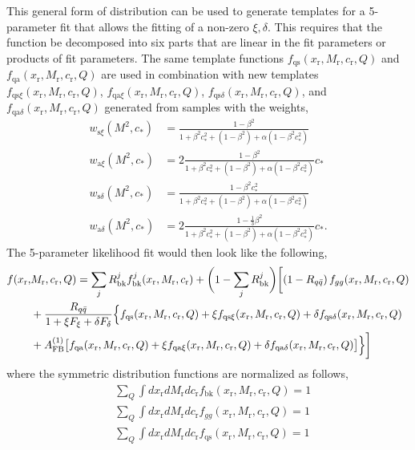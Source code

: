 This general form of distribution can be used to generate templates for a 5-parameter fit that allows the fitting of a non-zero $\xi,\delta$.  This requires that the function be decomposed into six parts that are linear in the fit parameters or products of fit parameters.  The same template functions $f_\mathrm{qs}(x_\mathrm{r}, M_\mathrm{r}, c_\mathrm{r},Q)$ and $f_\mathrm{qa}(x_\mathrm{r}, M_\mathrm{r}, c_\mathrm{r},Q)$ are used in combination with new templates $f_{\mathrm{qs}\xi}(x_\mathrm{r}, M_\mathrm{r}, c_\mathrm{r},Q)$, $f_{\mathrm{qa}\xi}(x_\mathrm{r}, M_\mathrm{r}, c_\mathrm{r},Q)$, $f_{\mathrm{qs}\delta}(x_\mathrm{r}, M_\mathrm{r}, c_\mathrm{r},Q)$, and $f_{\mathrm{qa}\delta}(x_\mathrm{r}, M_\mathrm{r}, c_\mathrm{r},Q)$ generated from samples with the weights,
\begin{align}
w_{\mathrm{s}\xi}(M^2, c_*) &= \frac{1-\beta^2}{1+\beta^2c_*^2+\left(1-\beta^2\right)+\alpha\left(1-\beta^2c_*^2\right)} \\
w_{\mathrm{a}\xi}(M^2, c_*) &= 2\frac{1-\beta^2}{1+\beta^2c_*^2+\left(1-\beta^2\right)+\alpha\left(1-\beta^2c_*^2\right)}c_*\\
w_{\mathrm{s}\delta}(M^2, c_*) &= \frac{1-\beta^2c_*^2}{1+\beta^2c_*^2+\left(1-\beta^2\right)+\alpha\left(1-\beta^2c_*^2\right)} \\
w_{\mathrm{a}\delta}(M^2, c_*) &= 2\frac{1-\frac{1}{3}\beta^2}{1+\beta^2c_*^2+\left(1-\beta^2\right)+\alpha\left(1-\beta^2c_*^2\right)}c_*.
\end{align}
The 5-parameter likelihood fit would then look like the following,
\begin{align}
f(x_\mathrm{r},&M_\mathrm{r},c_\mathrm{r},Q) =  \sum_jR^j_\mathrm{bk}f^j_\mathrm{bk}(x_\mathrm{r},M_\mathrm{r},c_\mathrm{r})+\biggl(1-\sum_jR^j_\mathrm{bk}\biggr )\biggl[ \left(1-R_{q\bar q}\right) f_{gg}(x_\mathrm{r},M_\mathrm{r},c_\mathrm{r},Q)\nonumber \\  \nonumber
&+\frac{R_{q\bar q}}{1+\xi F_{\xi}+\delta F_{\delta}}\Bigl\lbrace f_\mathrm{qs}(x_\mathrm{r}, M_\mathrm{r}, c_\mathrm{r},Q)+\xi f_{\mathrm{qs}\xi}(x_\mathrm{r}, M_\mathrm{r}, c_\mathrm{r},Q)+\delta f_{\mathrm{qs}\delta}(x_\mathrm{r}, M_\mathrm{r}, c_\mathrm{r},Q) \\
&+A_\mathrm{FB}^{(1)}\bigl[f_\mathrm{qa}(x_\mathrm{r}, M_\mathrm{r}, c_\mathrm{r},Q)+\xi f_{\mathrm{qa}\xi}(x_\mathrm{r}, M_\mathrm{r}, c_\mathrm{r},Q)+\delta f_{\mathrm{qa}\delta}(x_\mathrm{r}, M_\mathrm{r}, c_\mathrm{r},Q)\bigr]\Bigr\rbrace\biggr]   \label{eq:sixparone}
\end{align}
where the symmetric distribution functions are normalized as follows,
\begin{align}
 & \sum_{Q}\int dx_\mathrm{r} dM_\mathrm{r} dc_\mathrm{r} f_{\mathrm{bk}}(x_\mathrm{r}, M_\mathrm{r}, c_\mathrm{r},Q) = 1\\
 & \sum_{Q}\int dx_\mathrm{r} dM_\mathrm{r} dc_\mathrm{r} f_{gg}(x_\mathrm{r}, M_\mathrm{r}, c_\mathrm{r},Q) = 1\\
  & \sum_{Q}\int dx_\mathrm{r} dM_\mathrm{r} dc_\mathrm{r} f_{\mathrm{qs}}(x_\mathrm{r}, M_\mathrm{r}, c_\mathrm{r},Q) = 1
 \end{align}

